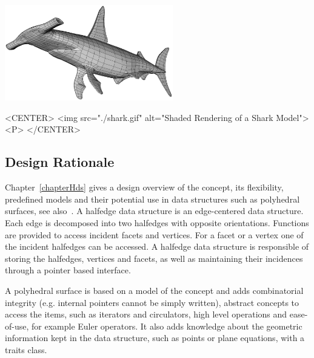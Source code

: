 \begin{ccTexOnly}
    \begin{center}~\hspace{5cm}
      \parbox{0.55\textwidth}{%
          \includegraphics[width=0.55\textwidth]{fig/shark.ps}%
      }
    \end{center}
    \vspace*{-16mm}
\end{ccTexOnly}

\begin{ccHtmlOnly}
    <CENTER>
        <img src="./shark.gif" alt="Shaded Rendering of a Shark Model"><P>
    </CENTER>
\end{ccHtmlOnly}

\subsection*{Design Rationale}

Chapter~\ref{chapterHds} gives a design overview of the
 concept, its flexibility, predefined
models and their potential use in data structures such as polyhedral
surfaces, see also~\cite{k-ddsps-98}. A halfedge data structure is an
edge-centered data structure. Each edge is decomposed into two
halfedges with opposite orientations. Functions are provided to access
incident facets and vertices. For a facet or a vertex one of the
incident halfedges can be accessed. A halfedge data structure is
responsible of storing the halfedges, vertices and facets, as well as
maintaining their incidences through a pointer based interface.

A polyhedral surface is based on a model of the
 concept and adds combinatorial integrity
(e.g. internal pointers cannot be simply written), abstract concepts
to access the items, such as iterators and circulators, high level
operations and ease-of-use, for example Euler operators. It also adds
knowledge about the geometric information kept in the data structure,
such as points or plane equations, with a traits class.

